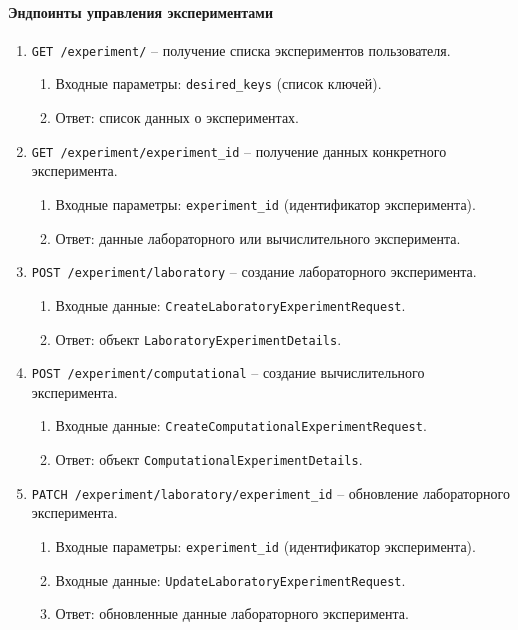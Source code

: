\paragraph{Эндпоинты управления экспериментами}

\begin{enumerate}
\item \texttt{GET /experiment/} -- получение списка экспериментов пользователя.
\begin{enumerate}[label=\arabic{enumi}.\arabic*.]
\item Входные параметры: \texttt{desired\_keys} (список ключей).
\item Ответ: список данных о экспериментах.
\end{enumerate}

\item \texttt{GET /experiment/{experiment\_id}} -- получение данных конкретного эксперимента.
\begin{enumerate}[label=\arabic{enumi}.\arabic*.]
\item Входные параметры: \texttt{experiment\_id} (идентификатор эксперимента).
\item Ответ: данные лабораторного или вычислительного эксперимента.
\end{enumerate}

\item \texttt{POST /experiment/laboratory} -- создание лабораторного эксперимента.
\begin{enumerate}[label=\arabic{enumi}.\arabic*.]
\item Входные данные: \texttt{CreateLaboratoryExperimentRequest}.
\item Ответ: объект \texttt{LaboratoryExperimentDetails}.
\end{enumerate}

\item \texttt{POST /experiment/computational} -- создание вычислительного эксперимента.
\begin{enumerate}[label=\arabic{enumi}.\arabic*.]
\item Входные данные: \texttt{CreateComputationalExperimentRequest}.
\item Ответ: объект \texttt{ComputationalExperimentDetails}.
\end{enumerate}

\item \texttt{PATCH /experiment/laboratory/{experiment\_id}} -- обновление лабораторного эксперимента.
\begin{enumerate}[label=\arabic{enumi}.\arabic*.]
\item Входные параметры: \texttt{experiment\_id} (идентификатор эксперимента).
\item Входные данные: \texttt{UpdateLaboratoryExperimentRequest}.
\item Ответ: обновленные данные лабораторного эксперимента.
\end{enumerate}


\end{enumerate}
